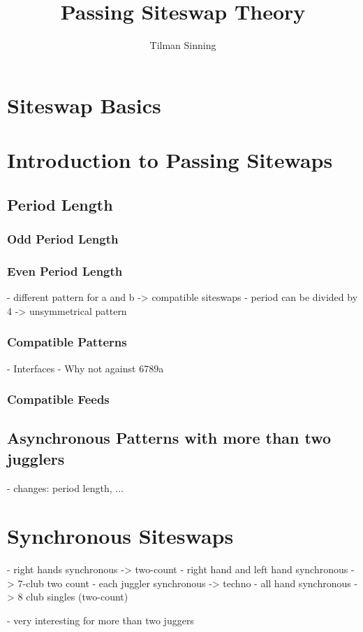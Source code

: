 \documentclass[a4paper,12pt,parskip=full]{scrreprt}
\title{Passing Siteswap Theory}
\author{Tilman Sinning}
\begin{document}
	\maketitle
	
	\tableofcontents

%	
	
	\chapter{Siteswap Basics}
	\chapter{Introduction to Passing Sitewaps}
	\section{Period Length}
	\subsection{Odd Period Length}
	\subsection{Even Period Length}
	 - different pattern for a and b -> compatible siteswaps
	 - period can be divided by 4 -> unsymmetrical pattern
	\subsection{Compatible Patterns}
	 - Interfaces
	 - Why not against 6789a
	\subsection{Compatible Feeds}
	\section{Asynchronous Patterns with more than two jugglers}
	- changes: period length, ...
	\chapter{Synchronous Siteswaps}
	- right hands synchronous -> two-count
	- right hand and left hand synchronous -> 7-club two count
	- each juggler synchronous -> techno
	- all hand synchronous -> 8 club singles (two-count)
	
	- very interesting for more than two juggers
	
\end{document}
